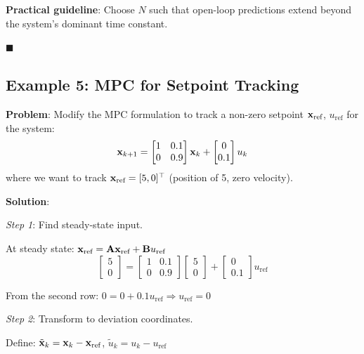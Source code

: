 \textbf{Practical guideline}: Choose $N$ such that open-loop predictions extend beyond the system's dominant time constant.

\hfill $\blacksquare$

\subsection{Example 5: MPC for Setpoint Tracking}

\textbf{Problem}: Modify the MPC formulation to track a non-zero setpoint $\mathbf{x}_{\text{ref}}$, $u_{\text{ref}}$ for the system:
\begin{equation}
    \mathbf{x}_{k+1} = \begin{bmatrix} 1 & 0.1 \\ 0 & 0.9 \end{bmatrix} \mathbf{x}_k + \begin{bmatrix} 0 \\ 0.1 \end{bmatrix} u_k
\end{equation}
where we want to track $\mathbf{x}_{\text{ref}} = [5, 0]^\top$ (position of 5, zero velocity).

\textbf{Solution}:

\textit{Step 1}: Find steady-state input.

At steady state: $\mathbf{x}_{\text{ref}} = \mathbf{A} \mathbf{x}_{\text{ref}} + \mathbf{B} u_{\text{ref}}$
\begin{equation}
    \begin{bmatrix} 5 \\ 0 \end{bmatrix} = \begin{bmatrix} 1 & 0.1 \\ 0 & 0.9 \end{bmatrix} \begin{bmatrix} 5 \\ 0 \end{bmatrix} + \begin{bmatrix} 0 \\ 0.1 \end{bmatrix} u_{\text{ref}}
\end{equation}

From the second row: $0 = 0 + 0.1 u_{\text{ref}} \Rightarrow u_{\text{ref}} = 0$

\textit{Step 2}: Transform to deviation coordinates.

Define: $\tilde{\mathbf{x}}_k = \mathbf{x}_k - \mathbf{x}_{\text{ref}}$, $\tilde{u}_k = u_k - u_{\text{ref}}$

